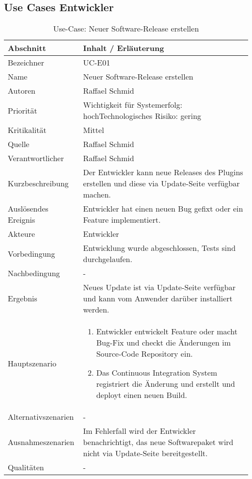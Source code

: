 \subsection{Use Cases Entwickler}
\begin{longtable}{|p{4cm}|p{10.5cm}|}
\caption{Use-Case: Neuer Software-Release erstellen}\\\hline
   \textbf{Abschnitt} & \textbf{Inhalt / Erläuterung} \\\hline
   Bezeichner & UC-E01\\\hline
   Name & Neuer Software-Release erstellen\\\hline
   Autoren & Raffael Schmid\\\hline
   Priorität & Wichtigkeit für Systemerfolg: hoch\newline Technologisches Risiko: gering\\\hline
   Kritikalität & Mittel\\\hline
   Quelle & Raffael Schmid\\\hline
   Verantwortlicher & Raffael Schmid\\\hline
   Kurzbeschreibung & Der Entwickler kann neue Releases des Plugins erstellen und diese via Update-Seite verfügbar machen.\\\hline
   Auslösendes Ereignis & Entwickler hat einen neuen Bug gefixt oder ein Feature implementiert.\\\hline
   Akteure & Entwickler\\\hline
   Vorbedingung & Entwicklung wurde abgeschlossen, Tests sind durchgelaufen.\\\hline
   Nachbedingung & -\\\hline
   Ergebnis & Neues Update ist via Update-Seite verfügbar und kann vom Anwender darüber installiert werden.\\\hline
   Hauptszenario & 
	\begin{enumerate}
		\item Entwickler entwickelt Feature oder macht Bug-Fix und checkt die Änderungen im Source-Code Repository ein.
		\item Das Continuous Integration System registriert die Änderung und erstellt und deployt einen neuen Build.
	\end{enumerate}
	\\\hline
   Alternativszenarien & -\\\hline
   Ausnahmeszenarien & Im Fehlerfall wird der Entwickler benachrichtigt, das neue Softwarepaket wird nicht via Update-Seite bereitgestellt.\\\hline
   Qualitäten & - \\\hline
\end{longtable}




